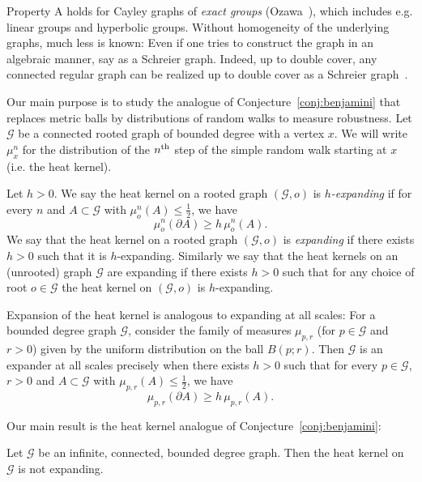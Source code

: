 \documentclass[AHL,Unicode,longabstracts,published]{cedram}
\newcommand{\calG}{\mathcal{G}}
\begin{document}
Property A holds for Cayley graphs of \emph{exact groups} (Ozawa~\cite{OzawaICM}), which includes e.g. linear groups and hyperbolic groups. Without homogeneity of the underlying graphs, much less is known: Even if one tries to construct the graph in an algebraic manner, say as a Schreier graph. Indeed, up to double cover, any connected regular graph can be realized up to double cover as a Schreier graph~\cite{Leemann22}.

Our main purpose is to study the analogue of Conjecture~\ref{conj:benjamini} that replaces metric balls by distributions of random walks to measure robustness. Let $\calG$ be a connected rooted graph of bounded degree with a vertex $x$. We will write $\mu^n_x$ for the distribution of the $n^{\rm th}$ step of the simple random walk starting at $x$ (i.e. the heat kernel).

\begin{defi}\label{dfn:expanding_walks}
Let $h>0$. We say the heat kernel on a rooted graph $(\calG,o)$ is $h$\emph{-expanding} if for every $n$ and $A\subset \calG$ with $\mu^n_o(A)\leq \frac{1}{2}$, we have
\begin{equation}\label{eq:expansion}
\mu^n_o(\partial A)\geq h \, \mu^n_o(A).
\end{equation}
We say that the heat kernel on a rooted graph $(\calG,o)$ is \emph{expanding} if there exists $h>0$ such that it is $h$-expanding. Similarly we say that the heat kernels on an (unrooted) graph $\calG$ are expanding if there exists $h>0$ such that for any choice of root $o\in \calG$ the heat kernel on $(\calG,o)$ is $h$-expanding.
\end{defi}


\begin{rema}\label{rmk:walks_vs_benjamini}
Expansion of the heat kernel is analogous to expanding at all scales: For a bounded degree graph $\calG$, consider the family of measures $\mu_{p,r}$ (for $p\in \calG$ and $r>0$) given by the uniform distribution on the ball $B(p;r)$. Then $\calG$ is an expander at all scales precisely when there exists $h>0$ such that for every $p\in \calG$, $r>0$ and $A\subset \calG$ with $\mu_{p,r}(A)\leq \frac{1}{2}$, we have
\[
\mu_{p,r}(\partial A)\geq h \, \mu_{p,r}(A).
\]
\end{rema}

Our main result is the heat kernel analogue of Conjecture~\ref{conj:benjamini}:

\begin{theo}\label{thm:main}
Let $\calG$ be an infinite, connected, bounded degree graph. Then the heat kernel on $\calG$ is not expanding.
\end{theo}
\end{document}
